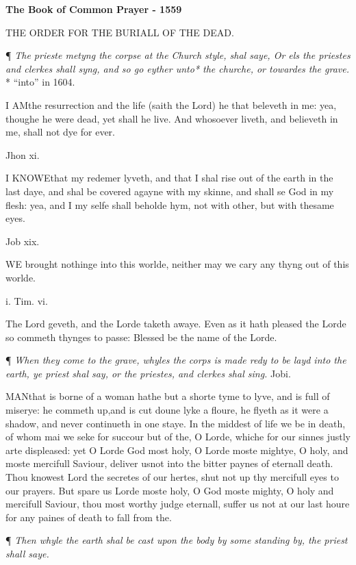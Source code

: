 
\textbf{The Book of Common Prayer - 1559}

THE
ORDER FOR THE
BURIALL
OF THE DEAD.

¶ \emph{The
prieste metyng the corpse at the Church style, shal saye, Or els the priestes
and clerkes shall syng, and so go eyther unto* the churche, or towardes
the grave.} *
``into''
in 1604.

I
AM\textbf{}the resurrection and the life (saith the Lord) he that beleveth
in me: yea, thoughe he were dead, yet shall he live. And whosoever liveth,
and believeth in me, shall not dye for ever.

Jhon xi.

I
KNOWE\textbf{}that my redemer lyveth, and that I shal rise out of the earth
in the last daye, and shal be covered agayne with my skinne, and shall
se God in my flesh: yea, and I my selfe shall beholde hym, not with other,
but with thesame eyes.

Job xix.

\textbf{}WE
brought nothinge into this worlde, neither may we cary any thyng out of
this worlde.

i. Tim. vi.

The
Lord geveth, and the Lorde taketh awaye. Even as it hath pleased the Lorde
so commeth thynges to passe: Blessed be the name of the Lorde.

¶ \emph{When
they come to the grave, whyles the corps is made redy to be layd into
the earth, ye priest shal say, or the priestes, and clerkes shal sing.} Job\textbf{}i.

MAN\textbf{}that is borne of a woman hathe but a shorte tyme to lyve, and is full
of miserye: he commeth up,\textbf{}and is cut doune lyke a floure, he flyeth
as it were a shadow, and never continueth in one staye. In the middest
of life we be in death, of whom mai we seke for succour but of the, O
Lorde, whiche for our sinnes justly arte displeased: yet O Lorde God most
holy, O Lorde moste mightye, O holy, and moste mercifull Saviour, deliver
us\textbf{}not into the bitter paynes of eternall death. Thou knowest Lord
the secretes of our hertes, shut not up thy mercifull eyes to our prayers.
But spare us Lorde moste holy, O God moste mighty, O holy and mercifull
Saviour, thou most worthy judge eternall, suffer us not at our last houre
for any paines of death to fall from the.

¶
\emph{Then whyle the earth shal be cast upon the body by some standing by,
the priest shall saye.}

